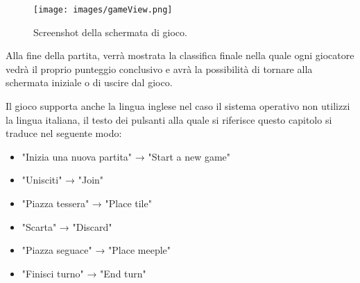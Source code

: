 \begin{figure}[ht]
    \centering\texttt{[image: images/gameView.png]}
    \caption{Screenshot della schermata di gioco.}
\end{figure}

Alla fine della partita, verrà mostrata la classifica finale nella quale ogni giocatore vedrà il proprio punteggio conclusivo e avrà la possibilità di tornare alla schermata iniziale o di uscire dal gioco.
\medskip

Il gioco supporta anche la lingua inglese nel caso il sistema operativo non utilizzi la lingua italiana, il testo dei pulsanti alla quale si riferisce questo capitolo si traduce nel seguente modo:
\begin{itemize}
    \item "Inizia una nuova partita" → "Start a new game"
    \item "Unisciti" → "Join"
    \item "Piazza tessera" → "Place tile"
    \item "Scarta" → "Discard"
    \item "Piazza seguace" → "Place meeple"
    \item "Finisci turno" → "End turn"
\end{itemize}
